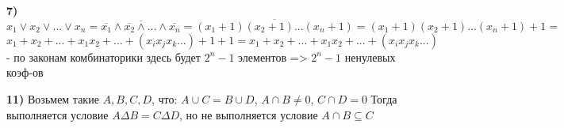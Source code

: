\documentclass[12pt,a4paper,fleqn]{article}
\begin{document}
{\bf 7)} $x_1 \lor x_2 \lor ... \lor x_n = \overline{\overline{x_1} \land \overline{x_2} \land ... \land \overline{x_n}} = \overline{(x_1 + 1)(x_2 + 1)...(x_n + 1)} = (x_1 + 1)(x_2 + 1)...(x_n + 1) + 1 = $ \newline
$x_1 + x_2 + ... + x_1x_2 + ...  + (x_ix_jx_k...) + 1 + 1 = x_1 + x_2 + ... + x_1x_2 + ... + (x_ix_jx_k...)$ - по законам комбинаторики здесь будет $2^n - 1$ элементов => $2^n - 1$ ненулевых коэф-ов \newline

{\bf 11)} Возьмем такие $A, B, C, D$, что: $A \cup C = B \cup D$, $A \cap B \ne 0$, $C \cap D = 0$ \newline
Тогда выполняется условие $A \Delta B = C \Delta D$, но не выполняется условие $A \cap B \subseteq C$
\end{document}
